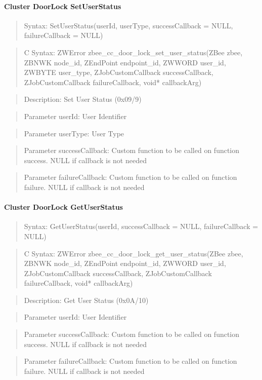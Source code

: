 \paragraph{Cluster DoorLock SetUserStatus}
\begin{quote}Syntax: SetUserStatus(userId, userType, successCallback = NULL, failureCallback = NULL)\end{quote}
\begin{quote}C Syntax: ZWError zbee\_cc\_door\_lock\_set\_user\_status(ZBee zbee, ZBNWK node\_id, ZEndPoint endpoint\_id, ZWWORD user\_id, ZWBYTE user\_type, ZJobCustomCallback successCallback, ZJobCustomCallback failureCallback, void* callbackArg)\end{quote}
\begin{quote}Description: Set User Status (0x09/9)\end{quote}
\begin{quote}Parameter userId: User Identifier\end{quote}
\begin{quote}Parameter userType: User Type\end{quote}
\begin{quote}Parameter successCallback: Custom function to be called on function success. NULL if callback is not needed\end{quote}
\begin{quote}Parameter failureCallback: Custom function to be called on function failure. NULL if callback is not needed\end{quote}


\paragraph{Cluster DoorLock GetUserStatus}
\begin{quote}Syntax: GetUserStatus(userId, successCallback = NULL, failureCallback = NULL)\end{quote}
\begin{quote}C Syntax: ZWError zbee\_cc\_door\_lock\_get\_user\_status(ZBee zbee, ZBNWK node\_id, ZEndPoint endpoint\_id, ZWWORD user\_id, ZJobCustomCallback successCallback, ZJobCustomCallback failureCallback, void* callbackArg)\end{quote}
\begin{quote}Description: Get User Status (0x0A/10)\end{quote}
\begin{quote}Parameter userId: User Identifier\end{quote}
\begin{quote}Parameter successCallback: Custom function to be called on function success. NULL if callback is not needed\end{quote}
\begin{quote}Parameter failureCallback: Custom function to be called on function failure. NULL if callback is not needed\end{quote}


